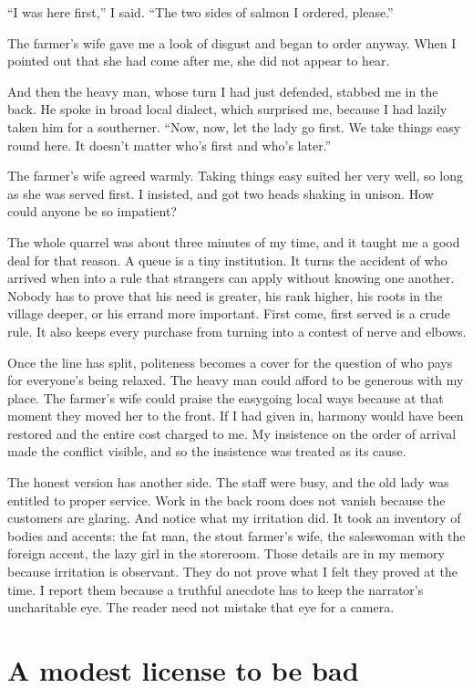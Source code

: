 \documentclass[12pt,a4paper]{book}
\begin{document}
``I was here first,'' I said. ``The two sides of salmon I ordered, please.''

The farmer's wife gave me a look of disgust and began to order anyway. When I pointed out that she had come after me, she did not appear to hear.

And then the heavy man, whose turn I had just defended, stabbed me in the back. He spoke in broad local dialect, which surprised me, because I had lazily taken him for a southerner. ``Now, now, let the lady go first. We take things easy round here. It doesn't matter who's first and who's later.''

The farmer's wife agreed warmly. Taking things easy suited her very well, so long as she was served first. I insisted, and got two heads shaking in unison. How could anyone be so impatient?

The whole quarrel was about three minutes of my time, and it taught me a good deal for that reason. A queue is a tiny institution. It turns the accident of who arrived when into a rule that strangers can apply without knowing one another. Nobody has to prove that his need is greater, his rank higher, his roots in the village deeper, or his errand more important. First come, first served is a crude rule. It also keeps every purchase from turning into a contest of nerve and elbows.

Once the line has split, politeness becomes a cover for the question of who pays for everyone's being relaxed. The heavy man could afford to be generous with my place. The farmer's wife could praise the easygoing local ways because at that moment they moved her to the front. If I had given in, harmony would have been restored and the entire cost charged to me. My insistence on the order of arrival made the conflict visible, and so the insistence was treated as its cause.

The honest version has another side. The staff were busy, and the old lady was entitled to proper service. Work in the back room does not vanish because the customers are glaring. And notice what my irritation did. It took an inventory of bodies and accents: the fat man, the stout farmer's wife, the saleswoman with the foreign accent, the lazy girl in the storeroom. Those details are in my memory because irritation is observant. They do not prove what I felt they proved at the time. I report them because a truthful anecdote has to keep the narrator's uncharitable eye. The reader need not mistake that eye for a camera.

\section{A modest license to be bad}
\end{document}
